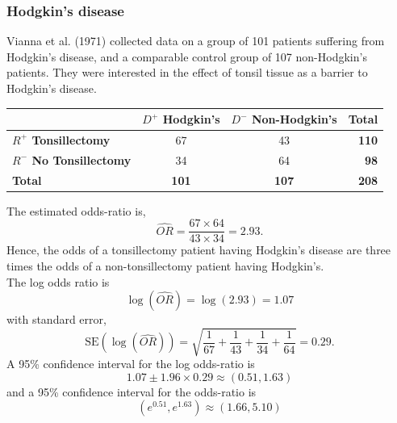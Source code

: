 \documentclass[a4paper]{article}\usepackage[]{graphicx}\usepackage[]{xcolor}
\begin{document}
\subsubsection{Hodgkin's disease}
Vianna et al. (1971) collected data on a group of 101 patients suffering from Hodgkin's disease, and a comparable control group of 107 non-Hodgkin's patients. They were interested in the effect of tonsil tissue as a barrier to Hodgkin's disease.
\begin{table}[H]
	\centering
	\begin{tabular}{@{}lccr@{}}
	\toprule
				 										   & \textcolor{mygreen}{\textbf{\( D^+ \) Hodgkin's}} & \textcolor{mygreen}{\textbf{\( D^- \) Non-Hodgkin's}} & \textbf{Total}    \\ \midrule
	\textcolor{myred}{\textbf{\( R^+ \) Tonsillectomy}}    & 67    		  									   & 43        		                                       & \textbf{110}  \\
	\textcolor{myred}{\textbf{\( R^- \) No Tonsillectomy}} & 34    		  									   & 64      		                                       & \textbf{98} \\ \midrule
	\textbf{Total} 										   & \textbf{101}				   					   & \textbf{107}                                          & \textbf{208} \\ \bottomrule
	\end{tabular}
\end{table}
The estimated odds-ratio is,
\[
	\widehat{OR} = \frac{67\times 64}{43 \times 34} = 2.93.
\]
Hence, the odds of a tonsillectomy patient having Hodgkin's disease are three times the odds of a non-tonsillectomy patient having Hodgkin's.\\
The log odds ratio is
\[
	\log(\widehat{OR}) = \log(2.93) = 1.07
\]
with standard error,
\[
	\text{SE}(\log(\widehat{OR})) = \textstyle\sqrt{\frac{1}{67} + \frac{1}{43} + \frac{1}{34} + \frac{1}{64}} = 0.29.
\]
A 95\% confidence interval for the log odds-ratio is
\[
	1.07 \pm 1.96 \times 0.29 \approx (0.51,1.63)
\]
and a 95\% confidence interval for the odds-ratio is
\[
	(e^{0.51},e^{1.63}) \approx (1.66,5.10)
\]
\end{document}
